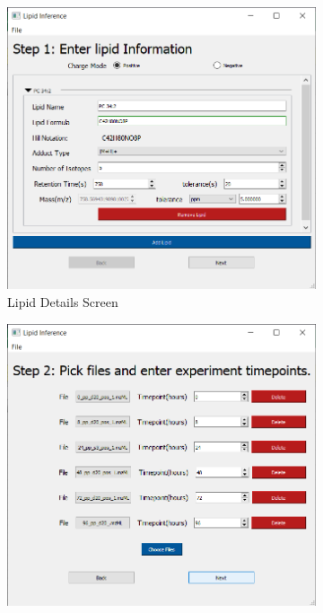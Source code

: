 \documentclass{l4proj}
\begin{document}
\begin{figure}[htb]
\centering
\begin{subfigure}{0.4\linewidth}
        \includegraphics[width=\linewidth]{dissertation/images/Screen1.png}
        \caption{Lipid Details Screen}
    \end{subfigure}
    \begin{subfigure}{0.4\linewidth}
        \includegraphics[width=\linewidth]{dissertation/images/screen2.png}

\end{subfigure}
\end{figure}
\end{document}
